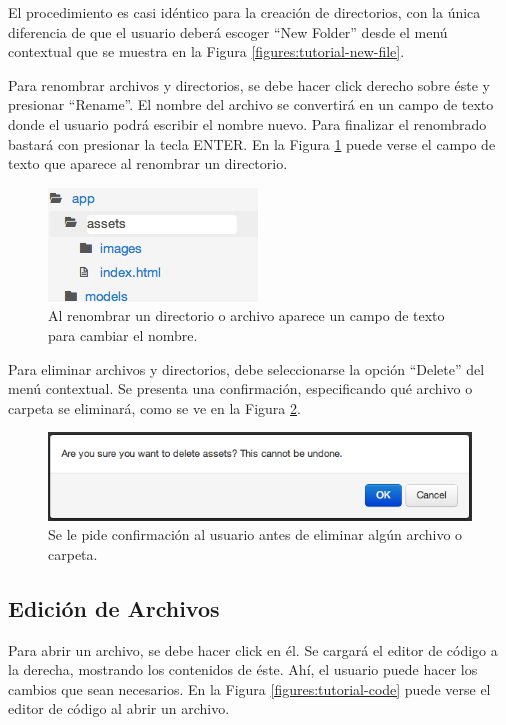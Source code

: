 \documentclass[12pt,spanish,letter]{report}
\makeatletter
\def\maxwidth{\ifdim\Gin@nat@width>\linewidth\linewidth
\else\Gin@nat@width\fi}
\let\Oldincludegraphics\includegraphics
\renewcommand{\includegraphics}[1]{\Oldincludegraphics[width=\maxwidth]{#1}}
\makeatother
\begin{document}
El procedimiento es casi idéntico para la creación de directorios, con
la única diferencia de que el usuario deberá escoger ``New Folder''
desde el menú contextual que se muestra en la Figura
\ref{figures:tutorial-new-file}.

Para renombrar archivos y directorios, se debe hacer click derecho sobre
éste y presionar ``Rename''. El nombre del archivo se convertirá en un
campo de texto donde el usuario podrá escribir el nombre nuevo. Para
finalizar el renombrado bastará con presionar la tecla ENTER. En la
Figura \ref{figures:tutorial-rename} puede verse el campo de texto que
aparece al renombrar un directorio.

\begin{figure}[htbp]
\centering
\includegraphics{figures/tutorial-rename.png}
\caption{Al renombrar un directorio o archivo aparece un campo de texto
para cambiar el nombre. \label{figures:tutorial-rename}}
\end{figure}

Para eliminar archivos y directorios, debe seleccionarse la opción
``Delete'' del menú contextual. Se presenta una confirmación,
especificando qué archivo o carpeta se eliminará, como se ve en la
Figura \ref{figures:tutorial-confirm}.

\begin{figure}[htbp]
\centering
\includegraphics{figures/tutorial-confirm.png}
\caption{Se le pide confirmación al usuario antes de eliminar algún
archivo o carpeta. \label{figures:tutorial-confirm}}
\end{figure}

\subsection{Edición de Archivos}

Para abrir un archivo, se debe hacer click en él. Se cargará el editor
de código a la derecha, mostrando los contenidos de éste. Ahí, el
usuario puede hacer los cambios que sean necesarios. En la Figura
\ref{figures:tutorial-code} puede verse el editor de código al abrir un
archivo.
\end{document}
